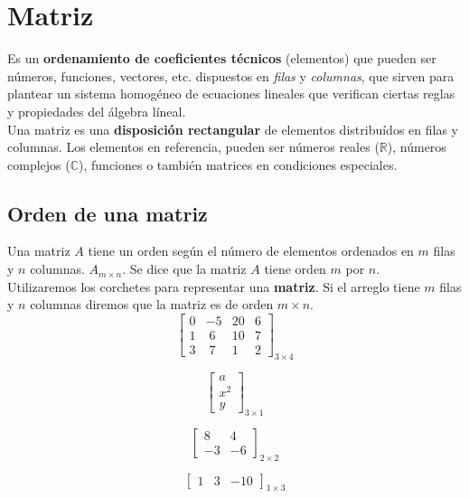 \documentclass[12pt, a5paper]{article}
\begin{document}
\section*{Matriz}
Es un \textbf{ordenamiento de coeficientes técnicos} (elementos) que pueden ser números, funciones, vectores, etc. dispuestos en \textit{filas} y \textit{columnas}, que sirven para plantear un sistema homogéneo de ecuaciones lineales que verifican ciertas reglas y propiedades del álgebra líneal. \\ 

\noindent Una matriz es una \textbf{disposición rectangular} de elementos distribuídos en filas y columnas. Los elementos en referencia, pueden ser números reales ($\mathbb{R}$), números complejos ($\mathbb{C}$), funciones o también matrices en condiciones especiales.

\subsection*{Orden de una matriz}
Una matriz $A$ tiene un orden según el número de elementos ordenados en $m$ filas y $n$ columnas. $A_{m \times n}$. Se dice que la matriz $A$ tiene orden $m$ por $n$. \\

\noindent Utilizaremos los corchetes para representar una \textbf{matriz}. Si el arreglo tiene $m$ filas y $n$ columnas diremos que la matriz es de orden $m \times n$. \\

$$
\begin{bmatrix}
0 & -5 & 20 & 6 \\
1 & \;6 & 10 & 7 \\
3 &  \;7 & 1 & 2
\end{bmatrix}_{3 \times 4}
$$

$$
\begin{bmatrix}
a \\
x^2 \\
y
\end{bmatrix}_{3 \times 1}
$$

$$
\begin{bmatrix}
 8 & 4 \\
 -3 & -6
\end{bmatrix}_{2 \times 2}
$$

$$
\begin{bmatrix}
1 & 3 & -10
\end{bmatrix}_{1 \times 3}
$$
\end{document}
